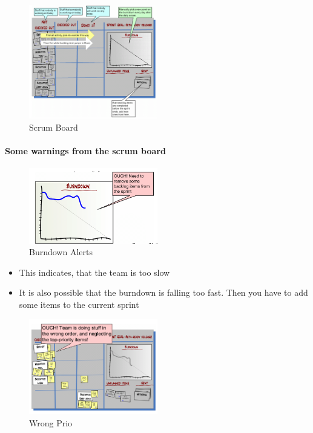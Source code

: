 \begin{figure}[H]
\centering
\includegraphics[width=0.5\textwidth]{figures/scrumBoard.png}
\caption{Scrum Board}
\end{figure}

\hypertarget{some-warnings-from-the-scrum-board}{%
\paragraph{Some warnings from the scrum
board}\label{some-warnings-from-the-scrum-board}}

\begin{figure}[H]
\centering
\includegraphics[width=0.5\textwidth]{figures/burndownAlert.png}
\caption{Burndown Alerts}
\end{figure}

\begin{itemize}
\tightlist
\item
  This indicates, that the team is too slow
\item
  It is also possible that the burndown is falling too fast. Then you
  have to add some items to the current sprint
\end{itemize}

\begin{figure}[H]
\centering
\includegraphics[width=0.5\textwidth]{figures/wrongPrio.png}
\caption{Wrong Prio}
\end{figure}

